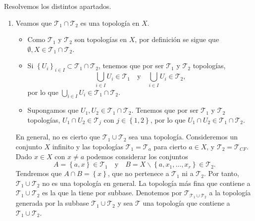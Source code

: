 \documentclass{article}
\begin{document}
\begin{sol}
Resolvemos los distintos apartados.
\begin{enumerate}
\item Veamos que $\displaystyle \mathcal{T}_{1}\cap \mathcal{T}_{2} $ es una topología en $\displaystyle X $. 
	\begin{itemize}
	\item Como $\displaystyle \mathcal{T}_{1} $ y $\displaystyle \mathcal{T}_{2} $ son topologías en $\displaystyle X $, por definición se sigue que $\displaystyle \emptyset, X \in \mathcal{T}_{1} \cap \mathcal{T}_{2} $. 
	\item Si $\displaystyle \left\{ U_{i}\right\} _{i \in I}\subset \mathcal{T}_{1}\cap \mathcal{T}_{2} $, tenemos que por ser $\displaystyle \mathcal{T}_{1} $ y $\displaystyle \mathcal{T}_{2} $ topologías, 
		\[\bigcup_{i \in I}U_{i} \in \mathcal{T}_{1} \quad \text{y} \quad \bigcup_{i \in I}U_{i} \in \mathcal{T}_{2} ,\]
		por lo que $\displaystyle \bigcup_{i \in I}U_{i} \in \mathcal{T}_{1} \cap \mathcal{T}_{2} $. 
	\item Supongamos que $\displaystyle U_{1}, U_{2}\in \mathcal{T}_{1} \cap \mathcal{T}_{2} $. Tenemos que por ser $\displaystyle \mathcal{T}_{1} $ y $\displaystyle \mathcal{T}_{2} $ topologías, $\displaystyle U_{1} \cap U_{2}\in \mathcal{T}_{j} $ con $\displaystyle j \in \left\{ 1, 2\right\}  $, por lo que $\displaystyle U_{1} \cap U_{2} \in \mathcal{T}_{1} \cap \mathcal{T}_{2} $. 
	\end{itemize}
En general, no es cierto que $\displaystyle \mathcal{T}_{1} \cup \mathcal{T}_{2} $ sea una topología. Consideremos un conjunto $\displaystyle X $ infinito y las topologías $\displaystyle \mathcal{T}_{1}=\mathcal{T}_{a} $ para cierto $\displaystyle a \in X $, y $\displaystyle \mathcal{T}_{2}=\mathcal{T}_{CF} $. Dado $\displaystyle x \in X $ con $\displaystyle x \neq a $ podemos considerar los conjuntos 
\[ A = \left\{ a,x\right\} \in \mathcal{T}_{1} \quad \text{y} \quad B = X \backslash \left\{ a, x_{1}, \ldots, x_{r}\right\} \in \mathcal{T}_{2} .\]
Tendremos que $\displaystyle A \cap B = \left\{ x\right\}   $, que no pertenece a $\displaystyle \mathcal{T}_{1} $ ni a $\displaystyle \mathcal{T}_{2} $. Por tanto, $\displaystyle \mathcal{T}_{1} \cup \mathcal{T}_{2} $ no es una topología en general. La topología más fina que contiene a $\displaystyle \mathcal{T}_{1}\cup \mathcal{T}_{2} $ es la que la tiene por subbase. Denotemos por $\displaystyle \mathcal{T}_{\mathcal{T}_{1}\cup\mathcal{T}_{2}} $ 
a la topología generada por la subbase $\displaystyle \mathcal{T}_{1} \cup \mathcal{T}_{2} $ y sea $\displaystyle \mathcal{T} $ una topología que contiene a $\displaystyle \mathcal{T}_{1} \cup \mathcal{T}_{2} $. 

\end{enumerate}
\end{sol}
\end{document}
